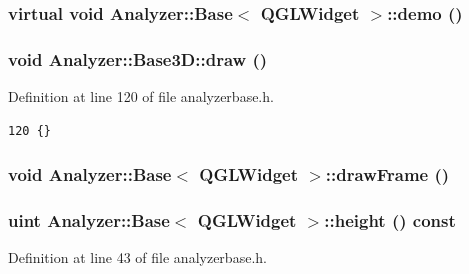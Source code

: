 \subsubsection{\setlength{\rightskip}{0pt plus 5cm}virtual void {\bf Analyzer::Base}$<$ {\bf QGLWidget}  $>$::demo ()\hspace{0.3cm}{\tt  [protected, virtual, inherited]}}\label{classAnalyzer_1_1Base_Analyzer_1_1Baseb5}


\subsubsection{\setlength{\rightskip}{0pt plus 5cm}void Analyzer::Base3D::draw ()\hspace{0.3cm}{\tt  [inline, private, slot]}}\label{classAnalyzer_1_1Base3D_Analyzer_1_1Base3Dk0}




Definition at line 120 of file analyzerbase.h.



\footnotesize\begin{verbatim}120 {}
\end{verbatim}\normalsize 
{}
\subsubsection{\setlength{\rightskip}{0pt plus 5cm}void {\bf Analyzer::Base}$<$ {\bf QGLWidget}  $>$::draw\-Frame ()\hspace{0.3cm}{\tt  [protected, inherited]}}\label{classAnalyzer_1_1Base_Analyzer_1_1Baseb1}


\subsubsection{\setlength{\rightskip}{0pt plus 5cm}uint {\bf Analyzer::Base}$<$ {\bf QGLWidget}  $>$::height () const\hspace{0.3cm}{\tt  [inline, inherited]}}\label{classAnalyzer_1_1Base_Analyzer_1_1Basea1}




Definition at line 43 of file analyzerbase.h.



